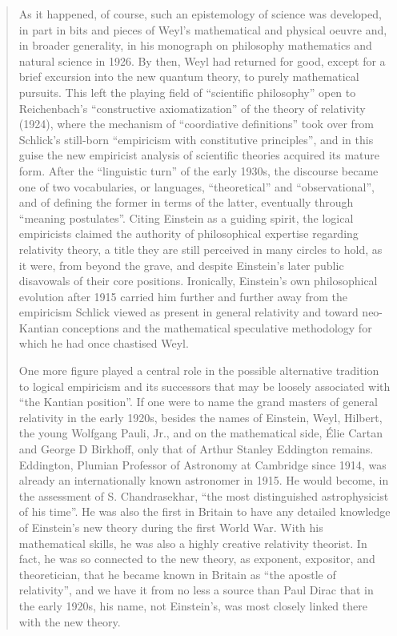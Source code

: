 \begin{quote}
    As it happened, of course, such an epistemology of science was developed, in part in bits and pieces of Weyl's mathematical and physical oeuvre and, in broader generality, in his monograph on philosophy mathematics and natural science in 1926.  By then, Weyl had returned for good, except for a brief excursion into the new quantum theory, to purely mathematical pursuits.  This left the playing field of ``scientific philosophy'' open to Reichenbach's ``constructive axiomatization'' of the theory of relativity (1924), where the mechanism of ``coordiative definitions'' took over from Schlick's still-born ``empiricism with constitutive principles'', and in this guise the new empiricist analysis of scientific theories acquired its mature form.  After the ``linguistic turn'' of the early 1930s, the discourse became one of two vocabularies, or languages, ``theoretical'' and ``observational'', and of defining the former in terms of the latter, eventually through ``meaning postulates''.  Citing Einstein as a guiding spirit, the logical empiricists claimed the authority of philosophical expertise regarding relativity theory, a title they are still perceived in many circles to hold, as it were, from beyond the grave, and despite Einstein's later public disavowals of their core positions.  Ironically, Einstein's own philosophical evolution after 1915 carried him further and further away from the empiricism Schlick viewed as present in general relativity and toward neo-Kantian conceptions and the mathematical speculative methodology for which he had once chastised Weyl.
    
    One more figure played a central role in the possible alternative tradition to logical empiricism and its successors that may be loosely associated with ``the Kantian position''.  If one were to name the grand masters of general relativity in the early 1920s, besides the names of Einstein, Weyl, Hilbert, the young Wolfgang Pauli, Jr., and on the mathematical side, \'Elie Cartan and George D Birkhoff, only that of Arthur Stanley Eddington remains.  Eddington, Plumian Professor of Astronomy at Cambridge since 1914, was already an internationally known astronomer in 1915.  He would become, in the assessment of S. Chandrasekhar, ``the most distinguished astrophysicist of his time''.  He was also the first in Britain to have any detailed knowledge of Einstein's new theory during the first World War.  With his mathematical skills, he was also a highly creative relativity theorist.  In fact, he was so connected to the new theory, as exponent, expositor, and theoretician, that he became known in Britain as ``the apostle of relativity'', and we have it from no less a source than Paul Dirac that in the early 1920s, his name, not Einstein's, was most closely linked there with the new theory.
    

\end{quote}
